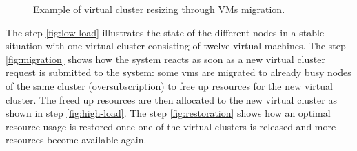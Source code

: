 \begin{figure}[h]
	\hfill
	\hfill
	\hfill
	\caption{Example of virtual cluster resizing through VMs migration.}
	\label{fig:migration-process}
\end{figure}

The step \ref{fig:low-load} illustrates the state of the different nodes in a stable situation with one virtual cluster consisting of twelve virtual machines. The step \ref{fig:migration} shows how the system reacts as soon as a new virtual cluster request is submitted to the system: some \glspl{vm} are migrated to already busy nodes of the same cluster (oversubscription) to free up resources for the new virtual cluster. The freed up resources are then allocated to the new virtual cluster as shown in step \ref{fig:high-load}. The step \ref{fig:restoration} shows how an optimal resource usage is restored once one of the virtual clusters is released and more resources become available again.

